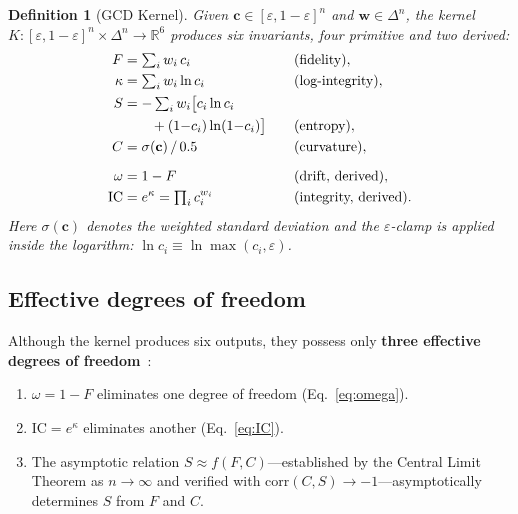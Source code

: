 \documentclass[
  aps,
  prd,
  twocolumn,
  superscriptaddress,
  nofootinbib,
  floatfix
]{revtex4-2}
\newtheorem{definition}[theorem]{Definition}
\newcommand{\eps}{\varepsilon}
\newcommand{\tvec}{\mathbf{c}}
\newcommand{\wvec}{\mathbf{w}}
\newcommand{\IC}{\mathrm{IC}}
\begin{document}
\begin{definition}[GCD Kernel]\label{def:kernel}
Given $\tvec \in [\eps, 1{-}\eps]^n$ and $\wvec \in \Delta^n$,
the kernel $K\colon [\eps, 1{-}\eps]^n \times \Delta^n
\to \mathbb{R}^6$ produces six invariants, four primitive and two
derived:
\begin{alignat}{2}
  F      &= \textstyle\sum_i w_i \, c_i
           &\quad& \text{(fidelity)}, \label{eq:F}\\
  \kappa &= \textstyle\sum_i w_i \ln c_i
           && \text{(log-integrity)}, \label{eq:kappa}\\
  S      &= -\textstyle\sum_i w_i
             \bigl[c_i \ln c_i \notag\\
         &\qquad + (1{-}c_i)\ln(1{-}c_i)\bigr]
           && \text{(entropy)}, \label{eq:S}\\
  C      &= \sigma(\tvec)\,/\,0.5
           && \text{(curvature)}, \label{eq:C}\\[6pt]
  \omega &= 1 - F
           && \text{(drift, derived)}, \label{eq:omega}\\
  \IC    &= e^{\kappa}
           = \textstyle\prod_i c_i^{w_i}
           && \text{(integrity, derived)}. \label{eq:IC}
\end{alignat}
Here $\sigma(\tvec)$ denotes the weighted standard deviation and the
$\eps$-clamp is applied inside the logarithm:
$\ln c_i \equiv \ln\max(c_i, \eps)$.
\end{definition}

\subsection{Effective degrees of freedom}

Although the kernel produces six outputs, they possess only
\textbf{three effective degrees of freedom}~\cite{paulus2025physicscoherence}:

\begin{enumerate}[leftmargin=*,label=(\alph*)]
\item $\omega = 1 - F$ eliminates one degree of freedom
  (Eq.~\ref{eq:omega}).
\item $\IC = e^\kappa$ eliminates another (Eq.~\ref{eq:IC}).
\item The asymptotic relation $S \approx f(F, C)$---established by
  the Central Limit Theorem as $n \to \infty$ and verified with
  $\mathrm{corr}(C, S) \to -1$---asymptotically determines $S$
  from $F$ and $C$.
\end{enumerate}
\end{document}
